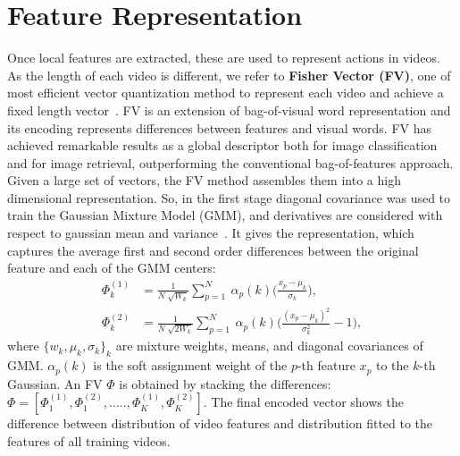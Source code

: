 \section{Feature Representation}
Once local features are extracted, these are used to represent actions in videos. As the length of each video is different, we refer to \textbf{Fisher Vector (FV)}, one of most efficient vector quantization method to represent each video and achieve a fixed length vector~\cite{perronnin2010improving,perronnin2007fisher}. FV is an extension of bag-of-visual word representation and its encoding represents differences between features and visual words. FV has achieved remarkable results as a global descriptor both for image classification and for image retrieval, outperforming the conventional bag-of-features approach.
Given a large set of vectors, the FV method assembles them into a high dimensional representation.
So, in the first stage diagonal covariance was used to train the Gaussian Mixture Model (GMM), and derivatives are considered with respect to gaussian mean and variance~\cite{simonyan2013fisher}. It gives the representation, which captures the average first and second order differences between the original feature and each of the GMM centers:
\begin{equation}
\begin{aligned}
\Phi_k^{(1)} & = \frac{1}{N  \sqrt[]{W_k}} \sum_{p=1}^{N}\ \alpha_p(k)\Bigg(\frac{x_p -\mu_k}{\sigma_k}\Bigg), \\
\Phi_k^{(2)} & = \frac{1}{N \sqrt[]{2W_k}} \sum_{p=1}^{N}\ \alpha_p(k)\Bigg(\frac{(x_p -\mu_k)^2}{\sigma_k^2} -1  \Bigg),
\end{aligned}
\end{equation}
where $\{w_k, \mu_k, \sigma_k\}_k$ are mixture weights, means, and diagonal covariances of GMM.  $\alpha_p(k)$ is the soft assignment weight of the $p$-th feature $x_p$ to the $k$-th Gaussian. An FV $\Phi$ is obtained by stacking the differences: $ \Phi = [{\Phi_1^{(1)},\Phi_1^{(2)},.....,\Phi_K^{(1)},\Phi_K^{(2)} }]$. The final encoded vector shows the difference between distribution of video features and distribution fitted to the features of all training videos.
